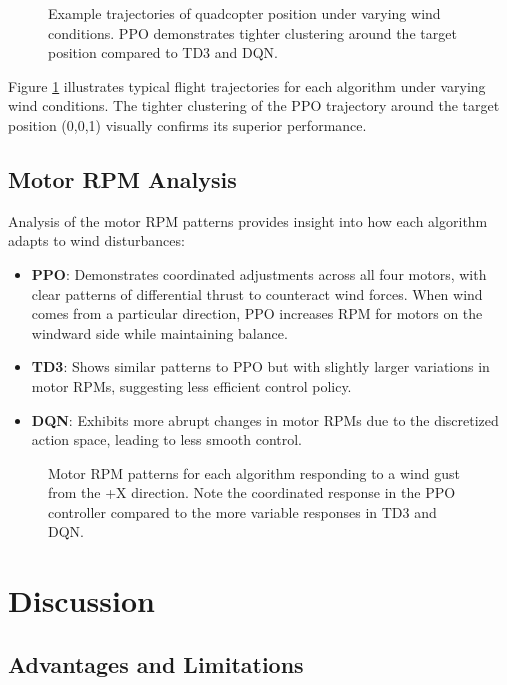 \documentclass[12pt]{article}
\begin{document}
\begin{figure}[htbp]
\centering
\caption{Example trajectories of quadcopter position under varying wind conditions. PPO demonstrates tighter clustering around the target position compared to TD3 and DQN.}
\label{fig:trajectories}
\end{figure}

Figure \ref{fig:trajectories} illustrates typical flight trajectories for each algorithm under varying wind conditions. The tighter clustering of the PPO trajectory around the target position (0,0,1) visually confirms its superior performance.

\subsection{Motor RPM Analysis}

Analysis of the motor RPM patterns provides insight into how each algorithm adapts to wind disturbances:

\begin{itemize}
    \item \textbf{PPO}: Demonstrates coordinated adjustments across all four motors, with clear patterns of differential thrust to counteract wind forces. When wind comes from a particular direction, PPO increases RPM for motors on the windward side while maintaining balance.
    
    \item \textbf{TD3}: Shows similar patterns to PPO but with slightly larger variations in motor RPMs, suggesting less efficient control policy.
    
    \item \textbf{DQN}: Exhibits more abrupt changes in motor RPMs due to the discretized action space, leading to less smooth control.
\end{itemize}

\begin{figure}[htbp]
\centering
\caption{Motor RPM patterns for each algorithm responding to a wind gust from the +X direction. Note the coordinated response in the PPO controller compared to the more variable responses in TD3 and DQN.}
\label{fig:motor_rpm}
\end{figure}

\section{Discussion}
\subsection{Advantages and Limitations}
\end{document}

